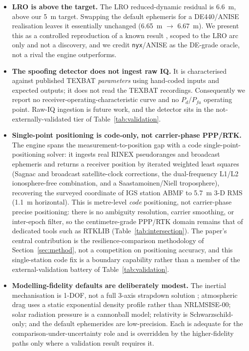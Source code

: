 \begin{itemize}
  \item \textbf{LRO is above the target.} The LRO reduced-dynamic
  residual is \SI{6.6}{\metre}, above our \SI{5}{\metre} target. Swapping the default
  ephemeris for a DE440/ANISE realisation leaves it essentially unchanged
  (\SI{6.65}{\metre} $\rightarrow$ \SI{6.67}{\metre}). We present this as a
  controlled reproduction of a known result \citep{bertone2021grail,li2023leopod},
  scoped to the LRO arc only and not a discovery, and we credit \texttt{nyx}/ANISE
  \citep{nyxanise} as the DE-grade oracle, not a rival the engine outperforms.

  \item \textbf{The spoofing detector does not ingest raw IQ.} It is characterised
  against published TEXBAT \emph{parameters} \citep{humphreys2012texbat} using
  hand-coded inputs and expected outputs; it does not read the TEXBAT recordings.
  Consequently we report no receiver-operating-characteristic curve and no
  $P_d$/$P_{fa}$ operating point. Raw-IQ ingestion is future work, and the detector
  sits in the not-externally-validated tier of Table~\ref{tab:validation}.

  \item \textbf{Single-point positioning is code-only, not carrier-phase
  PPP/RTK.} The engine spans the measurement-to-position gap with a code
  single-point-positioning solver: it ingests real RINEX pseudoranges and
  broadcast ephemeris and returns a receiver position by iterated weighted
  least squares (Sagnac and broadcast satellite-clock corrections, the
  dual-frequency L1/L2 ionosphere-free combination, and a Saastamoinen/Niell
  troposphere), recovering the surveyed coordinate of IGS station ABMF to
  \SI{5.7}{\metre} 3-D RMS (\SI{1.1}{\metre} horizontal). This is metre-level
  \emph{code} positioning, not carrier-phase precise positioning: there is no
  ambiguity resolution, carrier smoothing, or inter-epoch filter, so the
  centimetre-grade PPP/RTK domain remains that of dedicated tools such as RTKLIB
  \citep{takasu2009} (Table~\ref{tab:intersection}). The paper's central
  contribution is the resilience-comparison methodology of
  Section~\ref{sec:method}, not a competition on positioning accuracy, and this
  single-station code fix is a boundary capability rather than a member of the
  external-validation battery of Table~\ref{tab:validation}.

  \item \textbf{Modelling-fidelity defaults are deliberately modest.} The inertial
  mechanisation is 1-DOF, not a full 3-axis strapdown solution \citep{groves2013};
  atmospheric drag uses a static exponential density profile rather than NRLMSISE-00;
  solar radiation pressure is a cannonball model; relativity is Schwarzschild-only;
  and the default ephemerides are low-precision. Each is adequate for the
  comparison-under-uncertainty role and is overridden by the higher-fidelity paths
  only where a validation result requires it.


\end{itemize}
